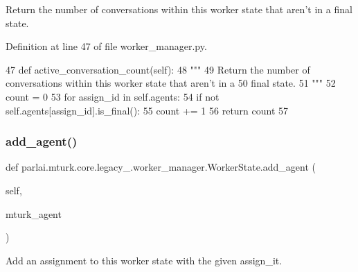 \begin{DoxyVerb}Return the number of conversations within this worker state that aren't in a
final state.
\end{DoxyVerb}
 

Definition at line 47 of file worker\+\_\+manager.\+py.


\begin{DoxyCode}
47     \textcolor{keyword}{def }active\_conversation\_count(self):
48         \textcolor{stringliteral}{"""}
49 \textcolor{stringliteral}{        Return the number of conversations within this worker state that aren't in a}
50 \textcolor{stringliteral}{        final state.}
51 \textcolor{stringliteral}{        """}
52         count = 0
53         \textcolor{keywordflow}{for} assign\_id \textcolor{keywordflow}{in} self.agents:
54             \textcolor{keywordflow}{if} \textcolor{keywordflow}{not} self.agents[assign\_id].is\_final():
55                 count += 1
56         \textcolor{keywordflow}{return} count
57 
\end{DoxyCode}
\mbox{\label{classparlai_1_1mturk_1_1core_1_1legacy__2018_1_1worker__manager_1_1WorkerState_a22b3660299c3dd56fb396bf9d6672d2a}} 
\subsubsection{\texorpdfstring{add\+\_\+agent()}{add\_agent()}}
{\footnotesize\ttfamily def parlai.\+mturk.\+core.\+legacy\+\_.\+worker\+\_\+manager.\+Worker\+State.\+add\+\_\+agent (\begin{DoxyParamCaption}\item[{}]{self,  }\item[{}]{mturk\+\_\+agent }\end{DoxyParamCaption})}

\begin{DoxyVerb}Add an assignment to this worker state with the given assign_it.
\end{DoxyVerb}
 

